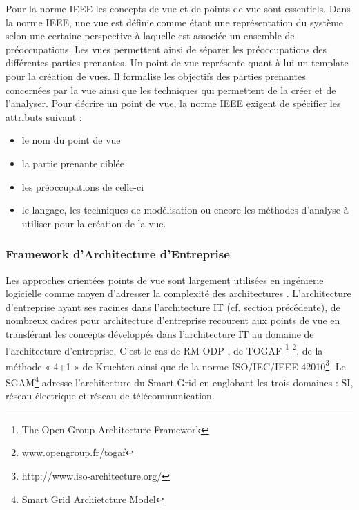Pour la norme IEEE les concepts de vue et de points de vue sont 
essentiels. 
Dans la norme IEEE, une vue est définie comme étant une représentation du système selon une certaine perspective à laquelle est associée un ensemble de préoccupations. Les vues 
permettent ainsi de séparer les préoccupations des différentes parties 
prenantes. Un point de vue représente quant à lui un template pour la création de 
vues. Il formalise les objectifs des parties prenantes concernées par la vue 
ainsi que les techniques qui permettent de la créer et de l'analyser. Pour 
décrire un point de vue, la norme IEEE exigent de spécifier les attributs 
suivant :
\begin{itemize}
\item le nom du point de vue
\item la partie prenante ciblée
\item les préoccupations de celle-ci
\item le langage, les techniques de modélisation ou encore les méthodes 
d'analyse à utiliser pour la création de la vue. 
\end{itemize}

\subsubsection{Framework d'Architecture d'Entreprise}

Les approches orientées points de vue sont largement utilisées en ingénierie logicielle comme moyen d'adresser la complexité des architectures \cite{steen2004supporting}. L'architecture d'entreprise ayant ses racines dans l'architecture IT 
(cf. section précédente), de nombreux cadres pour architecture d'entreprise 
recourent aux points de vue en transférant les concepts développés dans 
l'architecture IT au domaine de l'architecture d'entreprise.  C'est le cas de RM-ODP \cite{raymond1995reference}, de TOGAF \footnote{The Open Group Architecture Framework} \footnote{www.opengroup.fr/togaf}, de la méthode « 4+1 » de Kruchten \cite{kruchten19954+} ainsi que de la norme ISO/IEC/IEEE 42010\footnote{http://www.iso-architecture.org/}. Le SGAM\footnote{Smart Grid Archietcture Model} \cite{uslar2012standardization} adresse l'architecture du Smart Grid en englobant les trois domaines : SI, réseau électrique et réseau de télécommunication. 

